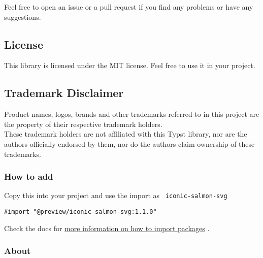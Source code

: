 Feel free to open an issue or a pull request if you find any problems or
have any suggestions.

\subsection{License}\label{license}

This library is licensed under the MIT license. Feel free to use it in
your project.

\subsection{Trademark Disclaimer}\label{trademark-disclaimer}

Product names, logos, brands and other trademarks referred to in this
project are the property of their respective trademark holders.\\
These trademark holders are not affiliated with this Typst library, nor
are the authors officially endorsed by them, nor do the authors claim
ownership of these trademarks.

\subsubsection{How to add}\label{how-to-add}

Copy this into your project and use the import as
\texttt{\ iconic-salmon-svg\ }

\begin{verbatim}
#import "@preview/iconic-salmon-svg:1.1.0"
\end{verbatim}



Check the docs for
\href{https://typst.app/docs/reference/scripting/\#packages}{more
information on how to import packages} .

\subsubsection{About}\label{about}

